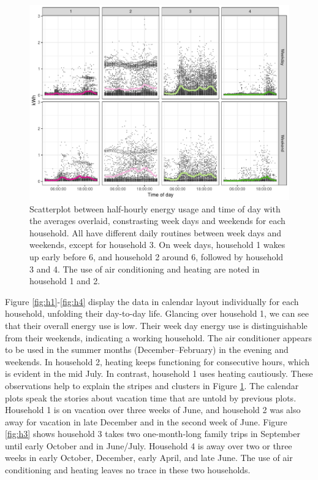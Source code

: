 \documentclass[12pt]{article}
\begin{document}
\begin{figure}

{\centering \includegraphics[width=\textwidth]{figure/hod-1} 

}

\caption{Scatterplot between half-hourly energy usage and time of day with the averages overlaid, constrasting week days and weekends for each household. All have different daily routines between week days and weekends, except for household 3. On week days, household 1 wakes up early before 6, and household 2 around 6, followed by household 3 and 4. The use of air conditioning and heating are noted in household 1 and 2.}\label{fig:hod}
\end{figure}

Figure \ref{fig:h1}-\ref{fig:h4} display the data in calendar layout individually for each household, unfolding their day-to-day life. Glancing over household 1, we can see that their overall energy use is low. Their week day energy use is distinguishable from their weekends, indicating a working household. The air conditioner appears to be used in the summer months (December--February) in the evening and weekends. In household 2, heating keeps functioning for consecutive hours, which is evident in the mid July. In contrast, household 1 uses heating cautiously. These observations help to explain the stripes and clusters in Figure \ref{fig:hod}. The calendar plots speak the stories about vacation time that are untold by previous plots. Household 1 is on vacation over three weeks of June, and household 2 was also away for vacation in late December and in the second week of June. Figure \ref{fig:h3} shows household 3 takes two one-month-long family trips in September until early October and in June/July. Household 4 is away over two or three weeks in early October, December, early April, and late June. The use of air conditioning and heating leaves no trace in these two households.
\end{document}
